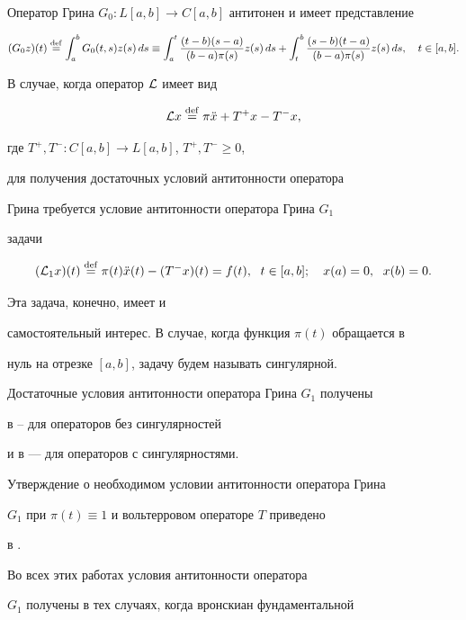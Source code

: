 Оператор Грина $G_0:L[a,b]\to C[a,b]$ антитонен и имеет представление


$$


(G_0z)(t)\df \int_a^bG_0(t,s)z(s)\,ds\equiv 


\int_a^t \frac{(t-b)(s-a)}{(b-a)\pi(s)}z(s)\,ds+


\int_t^b \frac{(s-b)(t-a)}{(b-a)\pi(s)}z(s)\,ds,\quad t\in[a,b].


$$





В случае, когда оператор ${\cal L}$ имеет вид


$$


\L x\df\pi \Ddot x + T^+x - T^-x,


$$


где $T^+,T^-: C[a,b]\to L[a,b]$, $T^+,T^-\ge0$,


для получения достаточных условий антитонности оператора


Грина требуется условие антитонности оператора Грина $G_1$


задачи


$$


(\L_1 x)(t)\df\pi(t) \Ddot x(t)-(T^-x)(t)=f(t),\ \; t\in[a,b];\quad


x(a)=0,\ \; x(b)=0.


$$





Эта задача, конечно, имеет и


самостоятельный интерес. В случае, когда функция $\pi(t)$ обращается в


нуль на отрезке $[a,b]$, задачу будем называть сингулярной.


Достаточные условия антитонности оператора Грина $G_1$ получены


в \cite{Kob}--\cite{AD2} для операторов без сингулярностей


и в \cite{AAB} --- для операторов с сингулярностями.


Утверждение о необходимом условии антитонности оператора Грина


$G_1$ при $\pi(t)\equiv1$ и вольтерровом операторе $T$ приведено


в \cite{Lab2}.





Во всех этих работах условия антитонности оператора


$G_1$ получены в тех случаях, когда вронскиан фундаментальной


